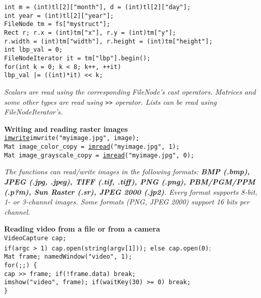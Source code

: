 \documentclass[10pt,landscape]{article}
\begin{document}
\begin{multicols}{3}
\begin{tabbing}
\texttt{int m = (int)tl[2]["month"], d = (int)tl[2]["day"];}\\
\texttt{int year = (int)tl[2]["year"];}\\

\texttt{FileNode tm = fs["mystruct"];}\\

\texttt{Rect r; r.x = (int)tm["x"], r.y = (int)tm["y"];}\\
\texttt{r.width = (int)tm["width"], r.height = (int)tm["height"];}\\
 
\texttt{int lbp\_val = 0;}\\
\texttt{FileNodeIterator it = tm["lbp"].begin();}\\

\texttt{for(int k = 0; k < 8; k++, ++it)}\\
\>\texttt{lbp\_val |= ((int)*it) << k;}\\
\end{tabbing}

\emph{Scalars are read using the corresponding FileNode's cast operators. Matrices and some other types are read using \texttt{>>} operator. Lists can be read using FileNodeIterator's.}

\begin{tabbing}
\textbf{Wr}\=\textbf{iting and reading raster images}\\
\texttt{\href{http://opencv.willowgarage.com/documentation/cpp/reading_and_writing_images_and_video.html\#cv-imwrite}{imwrite}{imwrite}("myimage.jpg", image);}\\
\texttt{Mat image\_color\_copy = \href{http://opencv.willowgarage.com/documentation/cpp/reading_and_writing_images_and_video.html\#cv-imread}{imread}("myimage.jpg", 1);}\\
\texttt{Mat image\_grayscale\_copy = \href{http://opencv.willowgarage.com/documentation/cpp/reading_and_writing_images_and_video.html\#cv-imread}{imread}("myimage.jpg", 0);}\\
\end{tabbing}

\emph{The functions can read/write images in the following formats: \textbf{BMP (.bmp), JPEG (.jpg, .jpeg), TIFF (.tif, .tiff), PNG (.png), PBM/PGM/PPM (.p?m), Sun Raster (.sr), JPEG 2000 (.jp2)}. Every format supports 8-bit, 1- or 3-channel images. Some formats (PNG, JPEG 2000) support 16 bits per channel.}

\begin{tabbing}
\textbf{Re}\=\textbf{ading video from a file or from a camera}\\
\texttt{VideoCapture cap;}\\
\texttt{if(argc > 1) cap.open(string(argv[1])); else cap.open(0)};\\
\texttt{Mat frame; namedWindow("video", 1);}\\
\texttt{for(;;) \{}\\
\>\texttt{cap >> frame; if(!frame.data) break;}\\
\>\texttt{imshow("video", frame); if(waitKey(30) >= 0) break;}\\
\texttt{\} }
\end{tabbing}


\end{multicols}
\end{document}
